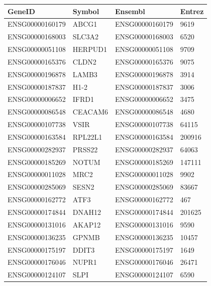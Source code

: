 \begingroup
\tiny
\setlength{\tabcolsep}{2pt}
\renewcommand{\arraystretch}{1.18}
\begin{tabular}{@{}llll@{}}
\toprule
GeneID & Symbol & Ensembl & Entrez \\
\midrule
ENSG00000160179 & ABCG1 & ENSG00000160179 & 9619 \\
ENSG00000168003 & SLC3A2 & ENSG00000168003 & 6520 \\
ENSG00000051108 & HERPUD1 & ENSG00000051108 & 9709 \\
ENSG00000165376 & CLDN2 & ENSG00000165376 & 9075 \\
ENSG00000196878 & LAMB3 & ENSG00000196878 & 3914 \\
ENSG00000187837 & H1-2 & ENSG00000187837 & 3006 \\
ENSG00000006652 & IFRD1 & ENSG00000006652 & 3475 \\
ENSG00000086548 & CEACAM6 & ENSG00000086548 & 4680 \\
ENSG00000107738 & VSIR & ENSG00000107738 & 64115 \\
ENSG00000163584 & RPL22L1 & ENSG00000163584 & 200916 \\
ENSG00000282937 & PRSS22 & ENSG00000282937 & 64063 \\
ENSG00000185269 & NOTUM & ENSG00000185269 & 147111 \\
ENSG00000011028 & MRC2 & ENSG00000011028 & 9902 \\
ENSG00000285069 & SESN2 & ENSG00000285069 & 83667 \\
ENSG00000162772 & ATF3 & ENSG00000162772 & 467 \\
ENSG00000174844 & DNAH12 & ENSG00000174844 & 201625 \\
ENSG00000131016 & AKAP12 & ENSG00000131016 & 9590 \\
ENSG00000136235 & GPNMB & ENSG00000136235 & 10457 \\
ENSG00000175197 & DDIT3 & ENSG00000175197 & 1649 \\
ENSG00000176046 & NUPR1 & ENSG00000176046 & 26471 \\
ENSG00000124107 & SLPI & ENSG00000124107 & 6590 \\
\bottomrule
\end{tabular}
\endgroup
